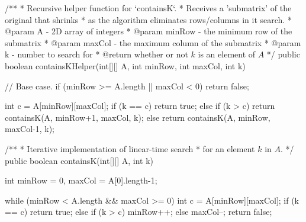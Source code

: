 \begin{itemize}
\begin{java}
        /**
         * Recursive helper function for `containsK`.
         * Receives a 'submatrix' of the original that shrinks
         * as the algorithm eliminates rows/columns in it search.
         * @param A - 2D array of integers
         * @param minRow - the minimum row of the submatrix
         * @param maxCol - the maximum column of the submatrix
         * @param k - number to search for
         * @return whether or not $k$ is an element of $A$
         */
        public boolean containsKHelper(int[][] A, int minRow, int maxCol, int k) {
            // Base case.
            if (minRow >= A.length || maxCol < 0) {
                return false;
            }

            int c = A[minRow][maxCol];
            if (k == c)
                return true;
            else if (k > c)
                return containsK(A, minRow+1, maxCol, k);
            else
                return containsK(A, minRow, maxCol-1, k);
        }
    \end{java}
    
    \begin{java}
        /**
         * Iterative implementation of linear-time search
         * for an element $k$ in $A$.
         */
        public boolean containsK(int[][] A, int k) {
            int minRow = 0, maxCol = A[0].length-1;

            while (minRow < A.length && maxCol >= 0) {
                int c = A[minRow][maxCol];
                if (k == c)
                    return true;
                else if (k > c)
                    minRow++;
                else
                    maxCol--;
            }
            return false;
        }
    \end{java}

\end{itemize}
    
